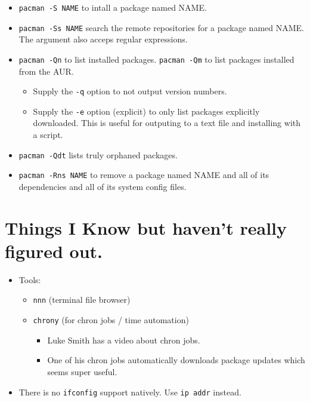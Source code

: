 \documentclass{article}
\begin{document}
    \begin{itemize}
      \item \verb|pacman -S NAME| to intall a package named NAME.
      \item \verb|pacman -Ss NAME| search the remote repositories for a package named NAME.
        The argument also acceps regular expressions.
      \item \verb|pacman -Qn| to list installed packages.
        \verb|pacman -Qm| to list packages installed from the AUR.
        \begin{itemize}
          \item Supply the \verb|-q| option to not output version numbers.
          \item Supply the \verb|-e| option (explicit) to only list packages explicitly downloaded.
            This is useful for outputing to a text file and installing with a script.
        \end{itemize}
      \item \verb|pacman -Qdt| lists truly orphaned packages.
      \item \verb|pacman -Rns NAME| to remove a package named NAME and all of its dependencies and all of its system config files.
    \end{itemize}

\section{Things I Know but haven't really figured out.}

\begin{itemize}
  \item Tools:
    \begin{itemize}
      \item \verb|nnn| (terminal file browser)
      \item \verb|chrony| (for chron jobs / time automation)
      \begin{itemize}
        \item Luke Smith has a video about chron jobs.
        \item One of his chron jobs automatically downloads package updates which seems super useful.
      \end{itemize}
    \end{itemize}
  \item There is no \verb|ifconfig| support natively. Use \verb|ip addr| instead.
\end{itemize}
\end{document}
